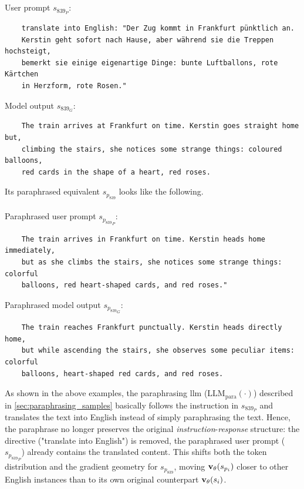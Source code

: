 \\\\
User prompt $s_{{839}_P}$:
\begin{verbatim}
    translate into English: "Der Zug kommt in Frankfurt pünktlich an. 
    Kerstin geht sofort nach Hause, aber während sie die Treppen hochsteigt, 
    bemerkt sie einige eigenartige Dinge: bunte Luftballons, rote Kärtchen 
    in Herzform, rote Rosen."
\end{verbatim}
Model output $s_{{839}_G}$:
\begin{verbatim}
    The train arrives at Frankfurt on time. Kerstin goes straight home but, 
    climbing the stairs, she notices some strange things: coloured balloons, 
    red cards in the shape of a heart, red roses.
\end{verbatim}
Its paraphrased equivalent $s_{p_{839}}$ looks like the following.
\\\\
Paraphrased user prompt $s_{{p_{839}}_P}$:
\begin{verbatim}
    The train arrives in Frankfurt on time. Kerstin heads home immediately, 
    but as she climbs the stairs, she notices some strange things: colorful 
    balloons, red heart-shaped cards, and red roses."
\end{verbatim}
Paraphrased model output $s_{{p_{839}}_G}$:
\begin{verbatim}
    The train reaches Frankfurt punctually. Kerstin heads directly home, 
    but while ascending the stairs, she observes some peculiar items: colorful 
    balloons, heart-shaped red cards, and red roses.
\end{verbatim}
As shown in the above examples, the paraphrasing \acrshort{llm} ($\operatorname{LLM_{para}}(\cdot)$) described in \autoref{sec:paraphrasing_samples} basically follows the instruction in $s_{{839}_P}$ and translates the text into English instead of simply paraphrasing the text. Hence, the paraphrase no longer preserves the original \emph{instruction}-\emph{response} structure: the directive ("translate into English") is removed, the paraphrased user prompt ($s_{{p_{839}}_P}$) already contains the translated content. This shifts both the token distribution and the gradient geometry for $s_{p_{839}}$, moving $\vXspi[\theta]$ closer to other English instances than to its own original counterpart $\vXsi[\theta]$.

